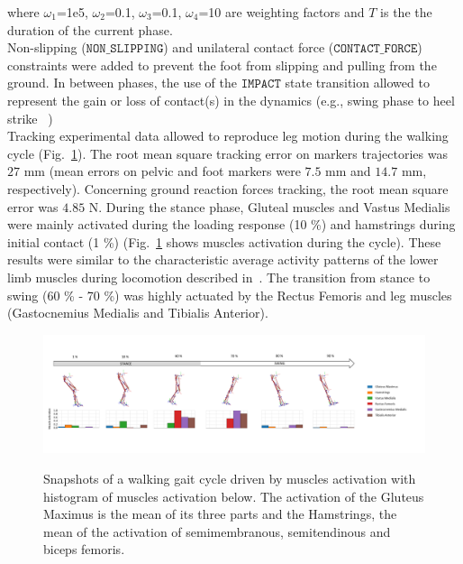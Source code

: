 \noindent where $\omega_1$=1e5, $\omega_2$=0.1, $\omega_3$=0.1, $\omega_4$=10 are  weighting factors and $T$ is the the duration of the current phase.\\

Non-slipping ($\mathtt{NON\_SLIPPING}$) and unilateral contact force ($\mathtt{CONTACT\_FORCE}$) constraints were added to prevent the foot from slipping and pulling from the ground. 
In between phases, the use of the $\mathtt{IMPACT}$ state transition allowed to represent the gain or loss of contact(s) in the dynamics (e.g., swing phase to heel strike ~\cite{felis_synthesis_2016}) \\

Tracking experimental data allowed to reproduce leg motion during the walking cycle (Fig.~\ref{fig:snapshots_multiphase_walking_cycle}). 
The root mean square tracking error on markers trajectories was $27$ mm (mean errors on pelvic and foot markers were $7.5$ mm and $14.7$ mm, respectively). 
Concerning ground reaction forces tracking, the root mean square error was $4.85$ N.
During the stance phase, Gluteal muscles and Vastus Medialis were mainly activated during the loading response (10 \%) and hamstrings during initial contact (1 \%) (Fig.~\ref{fig:snapshots_multiphase_walking_cycle} shows muscles activation during the cycle). 
These results were similar to the characteristic average activity patterns of the lower limb muscles during locomotion described in~\cite{winter_biomechanics_1991}. 
The transition from stance to swing (60 \% - 70 \%) was highly actuated by the Rectus Femoris and leg muscles (Gastocnemius Medialis and Tibialis Anterior). 

\begin{figure}[t!]
\centering
\includegraphics[width=\textwidth]{figures/multiphase_walking_cycle.png}\\
\caption{Snapshots of a walking gait cycle driven by muscles activation with histogram of muscles activation below. The activation of the Gluteus Maximus is the mean of its three parts and the Hamstrings, the mean of the activation of semimembranous, semitendinous and biceps femoris. }
\label{fig:snapshots_multiphase_walking_cycle}
\end{figure}
